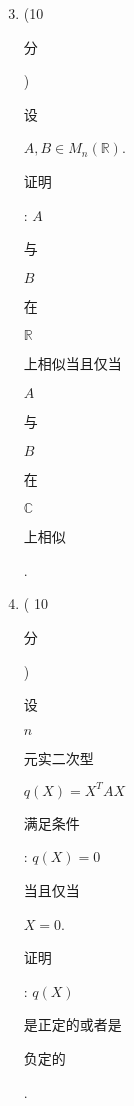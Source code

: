 \documentclass[10pt]{article}
\begin{document}
\begin{enumerate}
  \setcounter{enumi}{2}
  \item (10 \begin{CJK}{UTF8}{mj}分\end{CJK}) \begin{CJK}{UTF8}{mj}设\end{CJK} $A, B \in M_{n}(\mathbb{R})$. \begin{CJK}{UTF8}{mj}证明\end{CJK}: $A$ \begin{CJK}{UTF8}{mj}与\end{CJK} $B$ \begin{CJK}{UTF8}{mj}在\end{CJK} $\mathbb{R}$ \begin{CJK}{UTF8}{mj}上相似当且仅当\end{CJK} $A$ \begin{CJK}{UTF8}{mj}与\end{CJK} $B$ \begin{CJK}{UTF8}{mj}在\end{CJK} $\mathbb{C}$ \begin{CJK}{UTF8}{mj}上相似\end{CJK}.

  \item ( 10 \begin{CJK}{UTF8}{mj}分\end{CJK}) \begin{CJK}{UTF8}{mj}设\end{CJK} $n$ \begin{CJK}{UTF8}{mj}元实二次型\end{CJK} $q(X)=X^{T} A X$ \begin{CJK}{UTF8}{mj}满足条件\end{CJK}: $q(X)=0$ \begin{CJK}{UTF8}{mj}当且仅当\end{CJK} $X=0$. \begin{CJK}{UTF8}{mj}证明\end{CJK}: $q(X)$ \begin{CJK}{UTF8}{mj}是正定的或者是\end{CJK} \begin{CJK}{UTF8}{mj}负定的\end{CJK}.


\end{enumerate}
\end{document}

